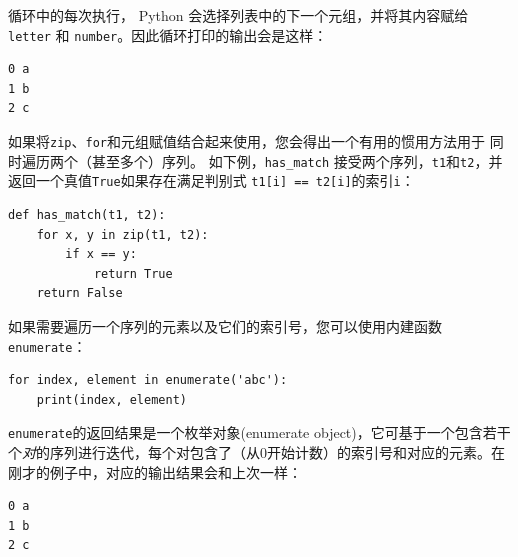 循环中的每次执行， Python 会选择列表中的下一个元组，并将其内容赋给 \lstinline{letter} 和 \lstinline{number}。因此循环打印的输出会是这样：

\begin{lstlisting}
0 a
1 b
2 c
\end{lstlisting}

%

如果将\lstinline{zip}、\lstinline{for}和元组赋值结合起来使用，您会得出一个有用的惯用方法用于
同时遍历两个（甚至多个）序列。 如下例，\lstinline{has_match} 接受两个序列，\lstinline{t1}和\lstinline{t2}，并返回一个真值\lstinline{True}如果存在满足判别式 \lstinline{t1[i] == t2[i]}的索引\lstinline {i}：

\begin{lstlisting}
def has_match(t1, t2):
    for x, y in zip(t1, t2):
        if x == y:
            return True
    return False
\end{lstlisting}

%

如果需要遍历一个序列的元素以及它们的索引号，您可以使用内建函数\lstinline{enumerate}：
  

\begin{lstlisting}
for index, element in enumerate('abc'):
    print(index, element)
\end{lstlisting}

%

\lstinline{enumerate}的返回结果是一个枚举对象(enumerate object)，它可基于一个包含若干个\emph{对}的序列进行迭代，每个对包含了（从0开始计数）的索引号和对应的元素。在刚才的例子中，对应的输出结果会和上次一样：

\begin{lstlisting}
0 a
1 b
2 c
\end{lstlisting}

